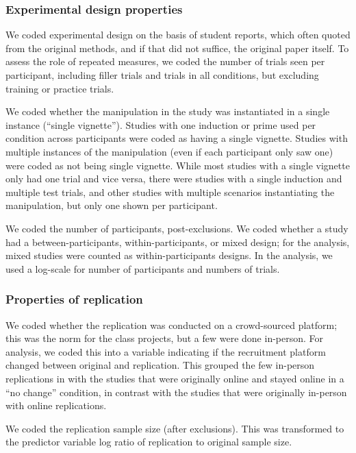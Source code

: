 \documentclass[
  english,
  a4paper,
]{article}
\begin{document}
\hypertarget{experimental-design-properties}{%
\subsubsection{Experimental design properties}\label{experimental-design-properties}}

We coded experimental design on the basis of student reports, which often quoted from the original methods, and if that did not suffice, the original paper itself. To assess the role of repeated measures, we coded the number of trials seen per participant, including filler trials and trials in all conditions, but excluding training or practice trials.

We coded whether the manipulation in the study was instantiated in a single instance (``single vignette''). Studies with one induction or prime used per condition across participants were coded as having a single vignette. Studies with multiple instances of the manipulation (even if each participant only saw one) were coded as not being single vignette. While most studies with a single vignette only had one trial and vice versa, there were studies with a single induction and multiple test trials, and other studies with multiple scenarios instantiating the manipulation, but only one shown per participant.

We coded the number of participants, post-exclusions. We coded whether a study had a between-participants, within-participants, or mixed design; for the analysis, mixed studies were counted as within-participants designs. In the analysis, we used a log-scale for number of participants and numbers of trials.

\hypertarget{properties-of-replication}{%
\subsubsection{Properties of replication}\label{properties-of-replication}}

We coded whether the replication was conducted on a crowd-sourced platform; this was the norm for the class projects, but a few were done in-person. For analysis, we coded this into a variable indicating if the recruitment platform changed between original and replication. This grouped the few in-person replications in with the studies that were originally online and stayed online in a ``no change'' condition, in contrast with the studies that were originally in-person with online replications.

We coded the replication sample size (after exclusions). This was transformed to the predictor variable log ratio of replication to original sample size.
\end{document}
